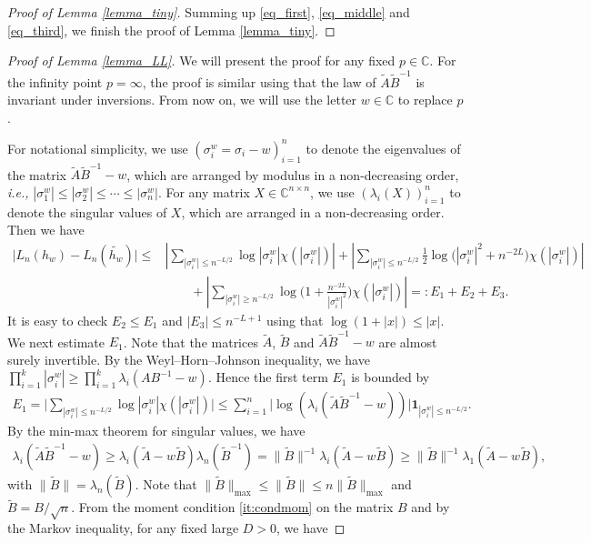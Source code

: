 \documentclass[10pt,reqno]{amsart}
\numberwithin{equation}{section}
\numberwithin{figure}{section}
\theoremstyle{plain}
\newcommand{\C}{{\mathbb{C}}}
\newcommand{\A}{{\tilde{A}}}
\newcommand{\B}{{\tilde{B}}}
\newcommand{\wt}{\widetilde}
\newcommand{\<}{\langle}
\renewcommand{\>}{\rangle}
\newcommand{\ie}{\emph{i.e., }}
\begin{document}
\begin{proof}[Proof of Lemma \ref{lemma_tiny}]
	Summing up \eqref{eq_first}, \eqref{eq_middle} and \eqref{eq_third}, we finish the proof of Lemma \ref{lemma_tiny}.
\end{proof}



\begin{proof}[Proof of Lemma \ref{lemma_LL}]
	We will present the proof for any fixed $p\in \C$. For the infinity point $p=\infty$, the proof is similar using that the law of $\A \B^{-1}$ is invariant under inversions. From now on, we will use the letter $w \in \C$ to replace $p$. 
	
	For notational simplicity, we use $(\sigma^w_i=\sigma_i-w)_{i=1}^n$ to denote the eigenvalues of the matrix $\A \B^{-1}-w$, which are arranged by modulus in a non-decreasing order, \ie $|\sigma^w_1| \leq |\sigma^w_2| \leq \cdots \leq |\sigma^w_n|$.  For any matrix $X\in \C^{n\times n}$, we use $(\lambda_i(X))_{i=1}^n$ to denote the singular values of $X$, which are arranged  in a non-decreasing order. Then we have 
	\begin{align}
		\big|L_n(h_w)-L_n(\wt{h_w})\big| \leq &\left| \sum_{|\sigma^w_i|\leq n^{-L/2}} \log|\sigma^w_i| \chi(|\sigma^w_i|) \right|+\left| \sum_{|\sigma^w_i|\leq n^{-L/2}} \frac{1}{2}\log \big(|\sigma^w_i|^2+n^{-2L}\big) \chi(|\sigma^w_i|) \right|\\
		& \qquad + \left| \sum_{|\sigma^w_i|\geq n^{-L/2}} \log \Big( 1+\frac{n^{-2L}}{|\sigma^w_i|^2} \Big) \chi(|\sigma^w_i|)\right|=:E_1+E_2+E_3.
	\end{align}
	It is easy to check $E_2\leq E_1$ and $|E_3| \leq n^{-L+1}$ using that $\log (1+|x|)\leq |x|$. We next estimate $E_1$.  Note that the matrices $\A$, $\B$ and $\A \B^{-1}-w$ are  almost surely invertible. By the Weyl–Horn–Johnson inequality, we have $\prod_{i=1}^k |\sigma^w_i| \geq \prod_{i=1}^k \lambda_i(AB^{-1}-w)$. Hence the first term $E_1$ is bounded by
	\begin{align}
		E_1= \Big|\sum_{|\sigma^w_i|\leq n^{-L/2}} \log|\sigma^w_i| \chi(|\sigma^w_i|)\Big| \leq \sum_{i=1}^n \big|\log(\lambda_i(\A \B^{-1}-w))\big| \mathbf{1}_{|\sigma^w_i| \leq n^{-L/2}}.
	\end{align}
	By the min-max theorem for singular values, we have
	\begin{align}
		\lambda_{i}(\A \B^{-1}-w) \geq \lambda_{i}(\A-w \B)\lambda_{n}(\B^{-1})= \|\B\|^{-1} \lambda_i(\A-w \B) \geq \|\B\|^{-1}\lambda_1(\A-w \B),
	\end{align}
	with $\|\B\|=\lambda_{n}(\B)$. Note that $\|\B\|_{\max} \leq \|\B\| \leq n \|\B\|_{\max}$ and $\B=B/\sqrt{n}$. From the moment condition \ref{it:condmom} on the matrix $B$ and by the Markov inequality, for any fixed large $D>0$, we have

\end{proof}
\end{document}
